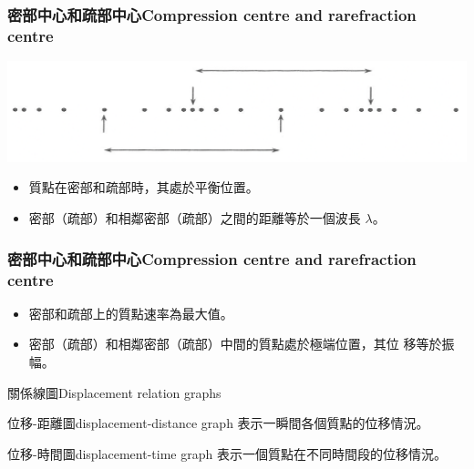 \documentclass[beamer=true]{standalone}
\begin{document}
\begin{frame}
    \frametitle{密部中心和疏部中心Compression centre and rarefraction centre}
    \bigskip
    \par{\par\centering\includegraphics[width=.8\textwidth]{./img/ch1_2024-05-09-11-45-52.png}\par}
    \bigskip \bigskip

    \begin{itemize}
        \item 質點在密部和疏部時，其處於平衡位置。
        \item 密部（疏部）和相鄰密部（疏部）之間的距離等於一個波長 $\lambda$。

    \end{itemize}
\end{frame}





\begin{frame}
    \frametitle{密部中心和疏部中心Compression centre and rarefraction centre}
    \begin{itemize}
        \item 密部和疏部上的質點速率為最大值。
        \item 密部（疏部）和相鄰密部（疏部）中間的質點處於極端位置，其位
              移等於振幅。
    \end{itemize}
\end{frame}

\begin{frame}{關係線圖Displacement relation graphs}
    \begin{block}{位移-距離圖displacement-distance graph}
        表示一瞬間各個質點的位移情況。
    \end{block}\bigskip
    \begin{block}{位移-時間圖displacement-time graph}
        表示一個質點在不同時間段的位移情況。
    \end{block}
\end{frame}
\end{document}
